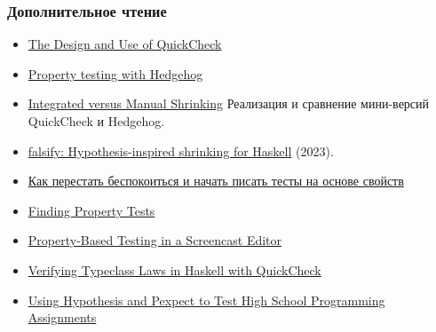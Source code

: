 \documentclass[11pt]{beamer}
\begin{document}
\begin{frame}[fragile]
  \frametitle{Дополнительное чтение}
  \small
  \begin{itemize}
    \item \href{https://begriffs.com/posts/2017-01-14-design-use-quickcheck.html}{The Design and Use of QuickCheck}
    \item \href{https://teh.id.au/posts/2017/04/23/property-testing-with-hedgehog/}{Property testing with Hedgehog}
    \item \href{http://www.well-typed.com/blog/2019/05/integrated-shrinking/}{Integrated versus Manual Shrinking} Реализация и сравнение мини-версий QuickCheck и Hedgehog.
    \item \href{https://well-typed.com/blog/2023/04/falsify/}{falsify: Hypothesis-inspired shrinking for Haskell} (2023).
    \item \href{https://habr.com/ru/post/434008/}{Как перестать беспокоиться и начать писать тесты на основе свойств}
    \item \href{https://www.hillelwayne.com/post/contract-examples/}{Finding Property Tests}
    \item \href{https://wickstrom.tech/programming/2019/03/02/property-based-testing-in-a-screencast-editor-introduction.html}{Property-Based Testing in a Screencast Editor}
    \item \href{https://austinrochford.com/posts/2014-05-27-quickcheck-laws.html}{Verifying Typeclass Laws in Haskell with QuickCheck}
    \item \href{https://blog.jrheard.com/hypothesis-and-pexpect}{Using Hypothesis and Pexpect to Test High School Programming Assignments}
  \end{itemize}
\end{frame}
\end{document}
